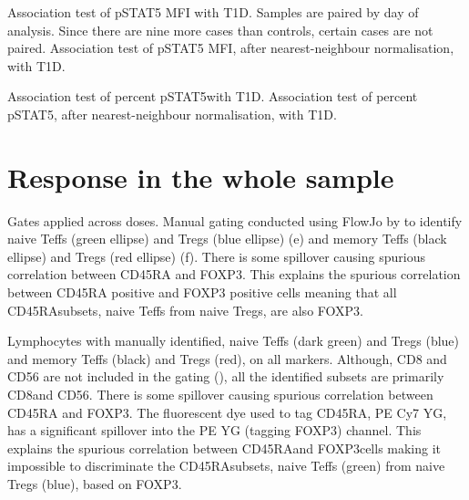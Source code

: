 
{
Association test of pSTAT5 MFI with T1D.
}
{
  Samples are paired by day of analysis.
  Since there are nine more cases than controls, certain cases are not paired.
}
{
Association test of pSTAT5 MFI, after nearest-neighbour normalisation, with T1D.
}
{ }
{ }

{ Association test of percent pSTAT5\positive with T1D. }
{ }
{
Association test of percent pSTAT5\positive, after nearest-neighbour normalisation, with T1D.
}
{ } 


\section{Response in the whole sample}

{ Gates applied across doses. }
{
Manual gating conducted using FlowJo by  to identify
naive Teffs (green ellipse) and Tregs (blue ellipse) (e)
and memory Teffs (black ellipse) and Tregs (red ellipse) (f).
There is some spillover causing spurious correlation between CD45RA and FOXP3.
This explains the spurious correlation between CD45RA positive and FOXP3 positive cells meaning that all CD45RA\positive subsets, naive Teffs from naive Tregs, are also FOXP3\positive.
}

{ Lymphocytes with manually identified, naive Teffs (dark green) and Tregs (blue) and memory Teffs (black) and Tregs (red), on all markers.  }
{
    Although, CD8 and CD56 are not included in the gating (), all the identified subsets are primarily CD8\negative and CD56\negative.
    There is some spillover causing spurious correlation between CD45RA and FOXP3.
    The fluorescent dye used to tag CD45RA, PE Cy7 YG, has a significant spillover into the PE YG (tagging FOXP3) channel.
    This explains the spurious correlation between CD45RA\positive and FOXP3\positive cells making it impossible to discriminate
    the CD45RA\positive subsets, naive Teffs (green) from naive Tregs (blue), based on FOXP3.  
}

